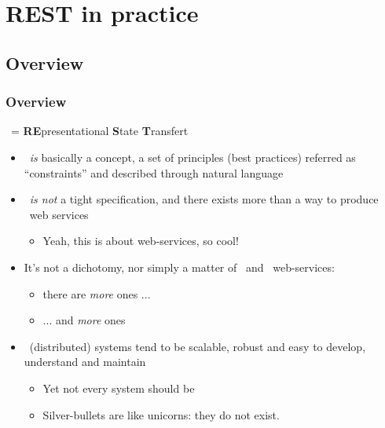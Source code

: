 \section{REST in practice}

\subsection{Overview}

\begin{frame}[allowframebreaks]
	\frametitle{Overview}

	\begin{block}{\rest\ = \textbf{RE}presentational \textbf{S}tate \textbf{T}ransfert}
	
		\begin{itemize}
		
		\item \rest\ \emph{is} basically a concept, a set of principles (best practices) referred as ``constraints'' and described through natural language
		
		\item \rest\ \emph{is not} a tight specification, and there exists more than a way to produce \restful\ web services 
			\begin{itemize} 
				\item Yeah, this is about web-services, so cool!
			\end{itemize}
			
		\item It's not a dichotomy, nor simply a matter of \restful\ and \restless\ web-services:
			\begin{itemize} 
				\item there are \emph{more \restful} ones ...
				\item ... and \emph{more \restless} ones
			\end{itemize}
			
		\item \restful\ (distributed) systems tend to be scalable, robust and easy to develop, understand and maintain
			\begin{itemize} 
				\item Yet not every system should be \restful
				\item Silver-bullets are like unicorns: they do not exist.
			\end{itemize}
		
		\end{itemize}
		
	\end{block}
	

\end{frame}
